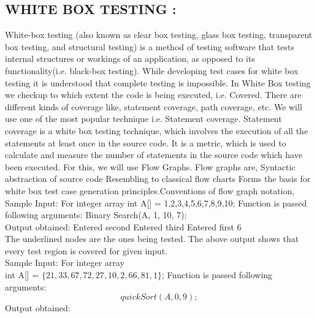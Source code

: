 \documentclass{article}
\begin{document}
{{			\subsection{WHITE BOX TESTING : }
			White-box testing (also known as clear box testing, glass box testing, transparent box testing, and structural testing) is a method of testing software that tests internal structures or workings of an application, as opposed to its functionality(i.e. black-box testing). While developing 
			test cases for white box testing it is understood that complete testing 
			is impossible. In White Box testing we checkup to which extent the code 
			is being executed, i.e. Covered. There are different kinds of coverage like, statement coverage, path coverage, etc. We will use one of the most popular technique i.e. Statement coverage. Statement coverage is a white box testing technique, which involves the execution of all the statements at least once in the source code. It is a metric, which is used to calculate and measure the number of statements in the source code which have been executed. For this, we will use Flow Graphs. Flow graphs are, Syntactic abstraction of source code Resembling to classical flow charts Forms the basis for white box test case generation principles.Conventions of flow graph notation, \\
			Sample Input: For integer array int A[] = 1,2,3,4,5,6,7,8,9,10; Function 
			is passed\\
			following arguments: Binary Search(A, 1, 10, 7);\\
			Output obtained: Entered second Entered third Entered first 6\\
			The underlined nodes are the ones being tested. The above output shows
			that every test region is covered for given input.\\
			
			
			\noindent Sample Input: For integer array\\
			int A[] = $\{ 21,33,67,72,27,10,2,66,81,1\}$;
			Function is passed following arguments:\\
			$$quickSort(A, 0, 9);$$
			Output obtained:\\
			
}}
\end{document}
